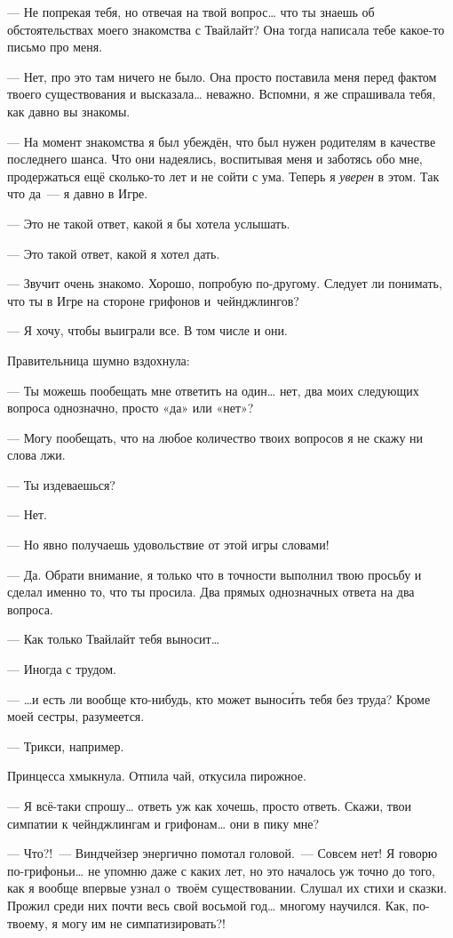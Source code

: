 \documentclass[fontsize=11pt,a5paper,titlepage=firstcover]{scrbook}
\begin{document}
--- Не попрекая тебя, но отвечая на твой вопрос{\ldots} что ты знаешь об обстоятельствах моего знакомства с Твайлайт? Она тогда написала тебе какое-то письмо про меня.

--- Нет, про это там ничего не было. Она просто поставила меня перед фактом твоего существования и высказала{\ldots} неважно. Вспомни, я же спрашивала тебя, как давно вы знакомы.

--- На момент знакомства я был убеждён, что был нужен родителям в качестве последнего шанса. Что они надеялись, воспитывая меня и заботясь обо мне, продержаться ещё сколько-то лет и не сойти с ума. Теперь я \emph{уверен} в этом. Так что да~--- я давно в Игре.

--- Это не такой ответ, какой я бы хотела услышать.

--- Это такой ответ, какой я хотел дать.

--- Звучит очень знакомо. Хорошо, попробую по-другому. Следует ли понимать, что ты в Игре на стороне грифонов и~чейнджлингов?

--- Я хочу, чтобы выиграли все. В том числе и они.

Правительница шумно вздохнула:

--- Ты можешь пообещать мне ответить на один{\ldots} нет, два моих следующих вопроса однозначно, просто «да» или «нет»?

--- Могу пообещать, что на любое количество твоих вопросов я не скажу ни слова лжи.

--- Ты издеваешься?

--- Нет.

--- Но явно получаешь удовольствие от этой игры словами!

--- Да. Обрати внимание, я только что в точности выполнил твою просьбу и сделал именно то, что ты просила. Два прямых однозначных ответа на два вопроса.

--- Как только Твайлайт тебя выносит{\ldots}

--- Иногда с трудом.

--- {\ldots}и есть ли вообще кто-нибудь, кто может выноси́ть тебя без труда? Кроме моей сестры, разумеется.

--- Трикси, например.

Принцесса хмыкнула. Отпила чай, откусила пирожное.

--- Я всё-таки спрошу{\ldots} ответь уж как хочешь, просто ответь. Скажи, твои симпатии к чейнджлингам и грифонам{\ldots} они в пику мне?

--- Что?!~--- Виндчейзер энергично помотал головой.~--- Совсем нет! Я говорю по-грифоньи{\ldots} не упомню даже с каких лет, но это началось уж точно до того, как я вообще впервые узнал о~твоём существовании. Слушал их стихи и сказки. Прожил среди них почти весь свой восьмой год{\ldots} многому научился. Как, по-твоему, я могу им не симпатизировать?!
\end{document}
